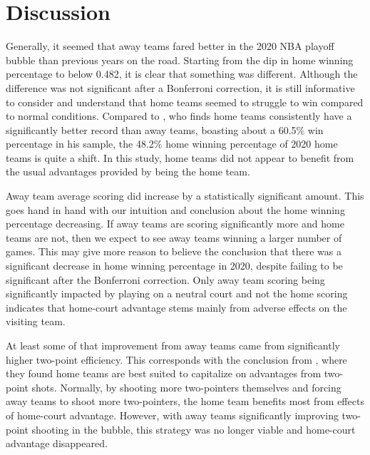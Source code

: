 \documentclass[10pt]{article}
\begin{document}
\section{Discussion}

Generally, it seemed that away teams fared better in the 2020 NBA playoff bubble
than previous years on the road. Starting from the dip in home winning percentage to
below 0.482, it is clear that something was different. Although the difference
was not significant after a Bonferroni correction, it is still informative to 
consider and understand that home teams seemed to struggle to win compared to
normal conditions. Compared to \citet{Kotecki}, who finds home teams consistently 
have a significantly better record than away teams, boasting about a 60.5\% win 
percentage in his sample, the 48.2\% home winning percentage of 2020 home teams 
is quite a shift. In this study, home teams did not appear to benefit from the 
usual advantages provided by being the home team.

Away team average scoring did increase by a statistically significant amount.
This goes hand in hand with our intuition and conclusion about the home winning 
percentage decreasing. If away teams are scoring significantly more and home 
teams are not, then we expect to see away teams winning a larger number of games. 
This may give more reason to believe the conclusion that there was a significant 
decrease in home winning percentage in 2020, despite failing to be significant after 
the Bonferroni correction. Only away team scoring being significantly impacted by 
playing on a neutral court and not the home scoring indicates that home-court 
advantage stems mainly from adverse effects on the visiting team.

At least some of that improvement from away teams came from significantly higher
two-point efficiency. This corresponds with the conclusion from \citet{Harris},
where they found home teams are best suited to capitalize on advantages from two-point
shots. Normally, by shooting more two-pointers themselves and forcing away teams to
shoot more two-pointers, the home team benefits most from effects of
home-court advantage. However, with away teams significantly improving two-point
shooting in the bubble, this strategy was no longer viable and home-court
advantage disappeared.
\end{document}
